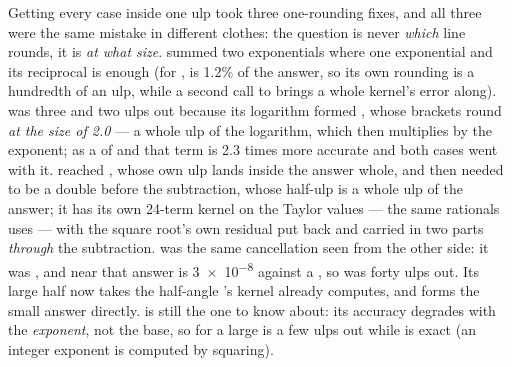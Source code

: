 Getting every case inside one ulp took three one-rounding
fixes, and all three were the same mistake in different clothes: the question is
never \emph{which} line rounds, it is \emph{at what size}.  summed two
exponentials where one exponential and its reciprocal is enough (for
,  is \num{1.2}\% of the answer, so its own rounding is a
hundredth of an ulp, while a second call to  brings a whole
kernel's
error along).  was three and two ulps out because its logarithm formed
, whose brackets round \emph{at the size of \num{2.0}} --- a whole
ulp of the logarithm, which  then multiplies by the exponent; as a
 of  and  that term is \num{2.3} times more
accurate and both cases went with it.  reached , whose own ulp
lands inside the answer whole, and then needed  to be a
double before the  subtraction, whose half-ulp is a whole ulp of the
answer; it has its own \num{24}-term kernel on the Taylor values
 --- the same rationals  uses --- with the square
root's own residual put back and  carried in two parts \emph{through} the
subtraction.  was the same cancellation seen from the other side: it
was , and near  that answer is \num{3e-8} against a
, so  was forty ulps out. Its large half now takes
the half-angle  's kernel already computes, and
forms the small answer directly.  is still the one to know about: its accuracy degrades with
the \emph{exponent}, not the base, so  for a large  is
a few ulps out while  is exact (an integer exponent is
computed by squaring).

